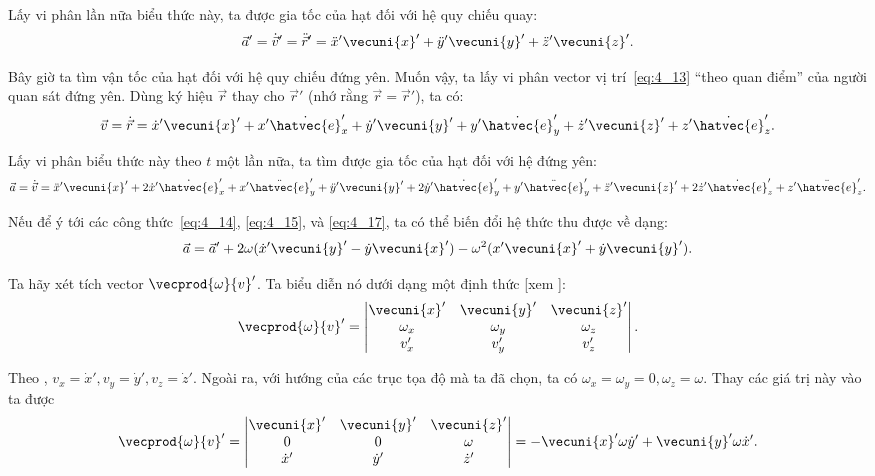 \noindent
Lấy vi phân lần nữa biểu thức này, ta được gia tốc của hạt đối với hệ quy chiếu quay:
\begin{equation}\label{eq:4_17}
\vec{a}' = \dot{\vec{v}}' = \ddot{\vec{r}}' = \ddot{x}'\vecuni{x}' + \ddot{y}'\vecuni{y}' + \ddot{z}'\vecuni{z}'.
\end{equation}

Bây giờ ta tìm vận tốc của hạt đối với hệ quy chiếu đứng yên. Muốn vậy, ta lấy vi phân vector vị trí~\eqref{eq:4_13} ``theo quan điểm'' của người quan sát đứng yên. Dùng ký hiệu $\vec{r}$ thay cho $\vec{r}'$ (nhớ rằng $\vec{r}=\vec{r}'$), ta có:
\begin{equation}\label{eq:4_18}
\vec{v} = \dot{\vec{r}} = \dot{x}'\vecuni{x}' + x'\dot{\hatvec{e}}_x' + \dot{y}'\vecuni{y}' + y'\dot{\hatvec{e}}_y' + \dot{z}'\vecuni{z}' + z'\dot{\hatvec{e}}_z'.
\end{equation}

\noindent
Lấy vi phân biểu thức này theo $t$ một lần nữa, ta tìm được gia tốc của hạt đối với hệ đứng yên:
\begin{equation*}
\vec{a} = \dot{\vec{v}} =
\ddot{x}'\vecuni{x}' + 2\dot{x}'\dot{\hatvec{e}}_x' + x'\ddot{\hatvec{e}}_y' + \ddot{y}'\vecuni{y}' + 2\dot{y}'\dot{\hatvec{e}}_y' + y'\ddot{\hatvec{e}}_y' + \ddot{z}'\vecuni{z}' + 2\dot{z}'\dot{\hatvec{e}}_z' + z'\ddot{\hatvec{e}}_z'.
\end{equation*}

\noindent
Nếu để ý tới các công thức~\eqref{eq:4_14}, \eqref{eq:4_15}, và \eqref{eq:4_17}, ta có thể biến đổi hệ thức thu được về dạng:
\begin{equation}\label{eq:4_19}
\vec{a} = \vec{a}' + 2\omega(\dot{x}'\vecuni{y}' - \dot{y}\vecuni{x}') - \omega^2(x'\vecuni{x}' + \dot{y}\vecuni{y}').
\end{equation}

Ta hãy xét tích vector $\vecprod{\omega}{v}'$. Ta biểu diễn nó dưới dạng một định thức [xem ]:
\begin{equation}\label{eq:4_20}
\vecprod{\omega}{v}' = \begin{vmatrix}
\vecuni{x}' & \vecuni{y}' & \vecuni{z}'\\
\omega_x & \omega_y & \omega_z\\
v_x' & v_y' & v_z'
\end{vmatrix}.
\end{equation}

\noindent
Theo , $v_x=\dot{x}', v_y=\dot{y}', v_z=\dot{z}'$. Ngoài ra, với hướng của các trục tọa độ mà ta đã chọn, ta có $\omega_x=\omega_y=0, \omega_z=\omega$. Thay các giá trị này vào  ta được
\begin{equation}\label{eq:4_21}
\vecprod{\omega}{v}' = \begin{vmatrix}
\vecuni{x}' & \vecuni{y}' & \vecuni{z}'\\
0 & 0 & \omega\\
\dot{x}' & \dot{y}' & \dot{z}'
\end{vmatrix} = -\vecuni{x}'\omega\dot{y}' + \vecuni{y}'\omega\dot{x}'.
\end{equation}

